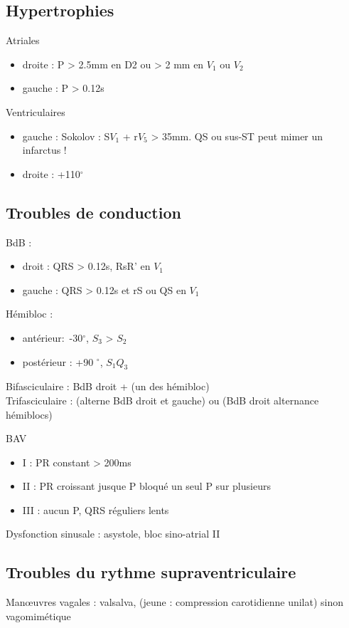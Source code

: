 \documentclass{article}
\begin{document}
\subsection{Hypertrophies}

Atriales
\begin{itemize}
  \item droite : P > 2.5mm en D2 ou > 2 mm en $V_1$ ou $V_2$
  \item gauche : P > 0.12s
\end{itemize}
Ventriculaires
\begin{itemize}
  \item gauche : Sokolov : S$V_1$ + r$V_5$ > 35mm. \danger{} QS ou sus-ST peut
    mimer un infarctus !
  \item droite : +110$^{\circ}$
\end{itemize}

\subsection{Troubles de conduction}
BdB :
\begin{itemize}
  \item droit : QRS > 0.12s, RsR' en $V_1$ 
  \item gauche : QRS > 0.12s et rS ou QS en $V_1$
\end{itemize}
Hémibloc : 
\begin{itemize}
  \item antérieur: -30$^{\circ}$, $S_3$ > $S_2$
  \item postérieur : +90 $^{\circ}$, $S_1 Q_3$
\end{itemize}
Bifasciculaire : BdB droit + (un des hémibloc)\\
Trifasciculaire \skull : (alterne BdB droit et gauche) ou (BdB droit \land{}
alternance hémiblocs)

BAV
\begin{itemize}
  \item I : PR constant > 200ms
  \item II : PR croissant jusque P bloqué \lor{} un seul P sur plusieurs
  \item III : aucun P, QRS réguliers lents
\end{itemize}

Dysfonction sinusale : asystole, bloc sino-atrial II

\subsection{Troubles du rythme supraventriculaire}
Man\oe{}uvres vagales : valsalva, (jeune : compression carotidienne unilat) sinon
vagomimétique
\end{document}
